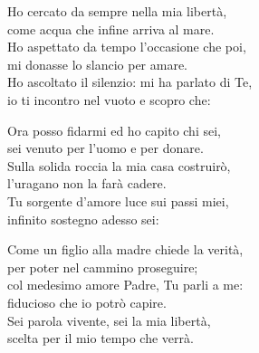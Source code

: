 
\strofa Ho cercato da sempre nella mia libertà,\\
come acqua che infine arriva al mare.\\
Ho aspettato da tempo l'occasione che poi,\\
mi donasse lo slancio per amare.\\
Ho ascoltato il silenzio: mi ha parlato di Te,\\
io ti incontro nel vuoto e scopro che:

\spazio


\spazio

\strofa Ora posso fidarmi ed ho capito chi sei,\\
sei venuto per l'uomo e per donare.\\
Sulla solida roccia la mia casa costruirò,\\
l'uragano non la farà cadere.\\
Tu sorgente d'amore luce sui passi miei,\\
infinito sostegno adesso sei:

\spazio


\spazio

\strofa Come un figlio alla madre chiede la verità,\\
per poter nel cammino proseguire;\\
col medesimo amore Padre, Tu parli a me:\\
fiducioso che io potrò capire.\\
Sei parola vivente, sei la mia libertà,\\
scelta per il mio tempo che verrà.

\spazio

